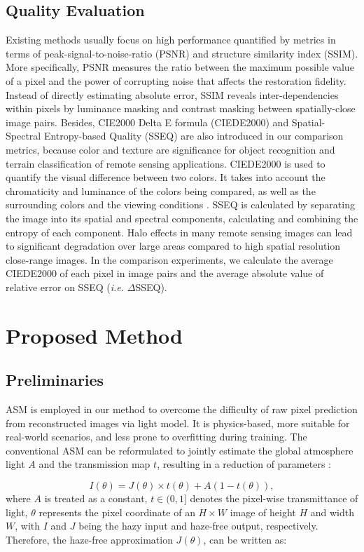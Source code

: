 \documentclass[lettersize,journal]{IEEEtran}
\begin{document}
\subsection{Quality Evaluation}
\label{subsec:2.3}
Existing methods usually focus on high performance quantified by metrics in terms of peak-signal-to-noise-ratio (PSNR) and structure similarity index (SSIM). More specifically, PSNR measures the ratio between the maximum possible value of a pixel and the power of corrupting noise that affects the restoration fidelity. Instead of directly estimating absolute error, SSIM reveals inter-dependencies within pixels by luminance masking and contrast masking between spatially-close image pairs. Besides, CIE2000 Delta E formula (CIEDE2000) and Spatial-Spectral Entropy-based Quality (SSEQ) are also introduced in our comparison metrics, because color and texture are significance for object recognition and terrain classification of remote sensing applications. CIEDE2000 is used to quantify the visual difference between two colors. It takes into account the chromaticity and luminance of the colors being compared, as well as the surrounding colors and the viewing conditions \cite{luo2001ciede2000}. SSEQ is calculated by separating the image into its spatial and spectral components, calculating and combining the entropy of each component\cite{liu2014sseq}. Halo effects in many remote sensing images can lead to significant degradation over large areas compared to high spatial resolution close-range images. In the comparison experiments, we calculate the average CIEDE2000 of each pixel in image pairs and the average absolute value of relative error on SSEQ (\textit{i.e.} $\Delta$SSEQ). 

\section{Proposed Method}
\subsection{Preliminaries}
ASM is employed in our method to overcome the difficulty of raw pixel prediction from reconstructed images via light model. It is physics-based, more suitable for real-world scenarios, and less prone to overfitting during training. The conventional ASM can be reformulated to jointly estimate the global atmosphere light $A$ and the transmission map $t$, resulting in a reduction of parameters \cite{li2017aod}:

\begin{equation}
    \label{deqn_ex1}
    I(\theta) = J(\theta) \times t(\theta) + A(1 - t(\theta)),
\end{equation}
where $A$ is treated as a constant, $t\in (0,1]$ denotes the pixel-wise transmittance of light, $\theta$ represents the pixel coordinate of an $H \times W$ image of height $H$ and width $W$, with $I$ and $J$ being the hazy input and haze-free output, respectively. Therefore, the haze-free approximation $J(\theta)$, can be written as:
\end{document}

